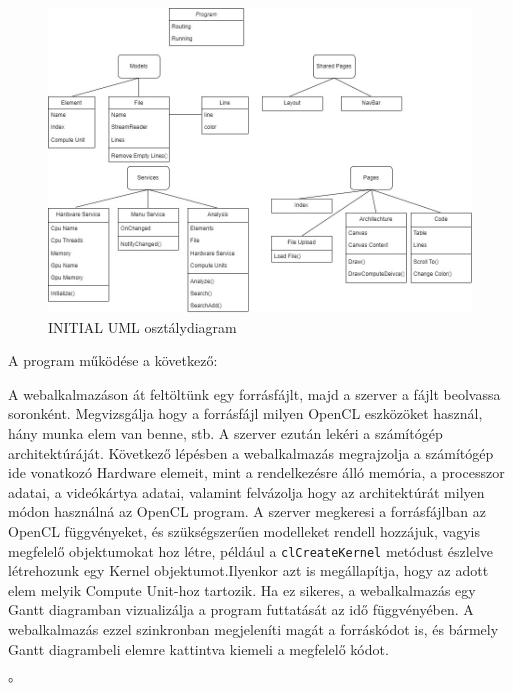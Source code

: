\begin{figure}[h]
\centering
\includegraphics[scale=0.5]{images/UML.jpg}
\caption{INITIAL UML osztálydiagram}
\label{fig:uml}
\end{figure}

A program működése a következő:

A webalkalmazáson át feltöltünk egy forrásfájlt, majd a szerver a fájlt beolvassa soronként. Megvizsgálja hogy a forrásfájl milyen OpenCL eszközöket használ, hány munka elem van benne, stb. A szerver ezután lekéri a számítógép architektúráját. Következő lépésben a webalkalmazás megrajzolja a számítógép ide vonatkozó Hardware elemeit, mint a rendelkezésre álló memória, a processzor adatai, a videókártya adatai, valamint felvázolja hogy az architektúrát milyen módon használná az OpenCL program. A szerver megkeresi a forrásfájlban az OpenCL függvényeket, és szükségszerűen modelleket rendell hozzájuk, vagyis megfelelő objektumokat hoz létre, például a \texttt{clCreateKernel} metódust észlelve létrehozunk egy Kernel objektumot.Ilyenkor azt is megállapítja, hogy az adott elem melyik Compute Unit-hoz tartozik. Ha ez sikeres, a webalkalmazás egy Gantt diagramban vizualizálja a program futtatását az idő függvényében. A webalkalmazás ezzel szinkronban megjeleníti magát a forráskódot is, és bármely Gantt diagrambeli elemre kattintva kiemeli a megfelelő kódot.

°%



